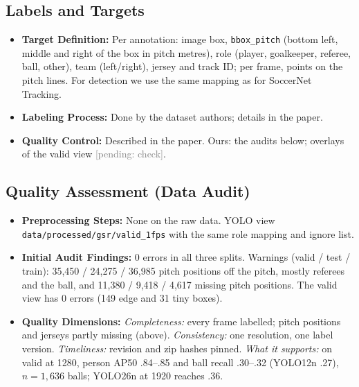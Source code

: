 \documentclass[11pt, a4paper]{article}
\newcommand{\pending}[1]{\textcolor{gray}{[pending: #1]}}
\begin{document}
\subsection{Labels and Targets}
\begin{itemize}
    \item \textbf{Target Definition:} Per annotation: image box, \texttt{bbox\_pitch} (bottom left, middle and right of the box in pitch metres), role (player, goalkeeper, referee, ball, other), team (left/right), jersey and track ID; per frame, points on the pitch lines. For detection we use the same mapping as for SoccerNet Tracking.
    \item \textbf{Labeling Process:} Done by the dataset authors; details in the paper.
    \item \textbf{Quality Control:} Described in the paper. Ours: the audits below; overlays of the valid view \pending{check}.
\end{itemize}

\subsection{Quality Assessment (Data Audit)}
\begin{itemize}
    \item \textbf{Preprocessing Steps:} None on the raw data. YOLO view \texttt{data/processed/gsr/valid\_1fps} with the same role mapping and ignore list.
    \item \textbf{Initial Audit Findings:} 0 errors in all three splits. Warnings (valid / test / train): 35,450 / 24,275 / 36,985 pitch positions off the pitch, mostly referees and the ball, and 11,380 / 9,418 / 4,617 missing pitch positions. The valid view has 0 errors (149 edge and 31 tiny boxes).
    \item \textbf{Quality Dimensions:} \emph{Completeness:} every frame labelled; pitch positions and jerseys partly missing (above). \emph{Consistency:} one resolution, one label version. \emph{Timeliness:} revision and zip hashes pinned. \emph{What it supports:} on valid at 1280, person AP50 .84--.85 and ball recall .30--.32 (YOLO12n .27), $n=1{,}636$ balls; YOLO26n at 1920 reaches .36.
\end{itemize}
\end{document}
